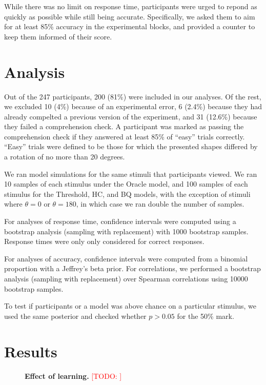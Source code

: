 \documentclass[10pt,letterpaper]{article}
\newcommand{\TODO}[1]{\textcolor{red}{[TODO: #1]}}
\newcommand{\Oc}[0]{Oracle}
\newcommand{\Th}[0]{Threshold}
\newcommand{\Hc}[0]{HC}
\newcommand{\Bq}[0]{BQ}
\begin{document}
While there was no limit on response time, participants were urged to
repond as quickly as possible while still being
accurate. Specifically, we asked them to aim for at least 85\%
accuracy in the experimental blocks, and provided a counter to keep
them informed of their score.

\section{Analysis}

Out of the 247 participants, 200 (81\%) were included in our
analyses. Of the rest, we excluded 10 (4\%) because of an experimental
error, 6 (2.4\%) because they had already compelted a previous version
of the experiment, and 31 (12.6\%) because they failed a comprehension
check. A participant was marked as passing the comprehension check if
they answered at least 85\% of ``easy'' trials correctly. ``Easy''
trials were defined to be those for which the presented shapes
differed by a rotation of no more than 20 degrees.

We ran model simulations for the same stimuli that participants
viewed. We ran 10 samples of each stimulus under the \Oc{} model, and
100 samples of each stimulus for the \Th{}, \Hc{}, and
\Bq{} models, with the exception of stimuli where
$\theta=0$ or $\theta=180$, in which case we ran double the number of
samples.

For analyses of response time, confidence intervals were computed
using a bootstrap analysis (sampling with replacement) with 1000
bootstrap samples. Response times were only only considered for
correct responses.

For analyses of accuracy, confidence intervals were
computed from a binomial proportion with a Jeffrey's beta prior.  For
correlations, we performed a bootstrap analysis (sampling with
replacement) over Spearman correlations using 10000 bootstrap samples.

To test if participants or a model was above chance on a particular
stimulus, we used the same posterior and checked whether $p>0.05$ for
the 50\% mark.

\section{Results}

\begin{figure}[t]
  \centering
  \caption{\textbf{Effect of learning.} \TODO{}}
  \label{fig:learning}
\end{figure}
\end{document}
